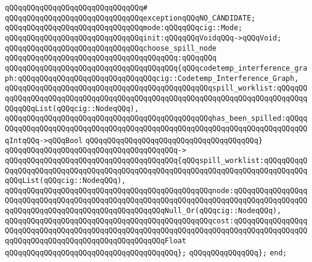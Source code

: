 \verb|qQQqqQQqqQQqqQQqqQQqqQQqqQQqqQQq#|\newline
\verb|qQQqqQQqqQQqqQQqqQQqqQQqqQQqqQQqexceptionqQQqNO_CANDIDATE;|\newline
\newline
\verb|qQQqqQQqqQQqqQQqqQQqqQQqqQQqqQQqmode:qQQqqQQqcig::Mode;|\newline
\newline
\verb|qQQqqQQqqQQqqQQqqQQqqQQqqQQqqQQqinit:qQQqqQQqVoidqQQq->qQQqVoid;|\newline
\newline
\verb|qQQqqQQqqQQqqQQqqQQqqQQqqQQqqQQqchoose_spill_node|\newline
\verb|qQQqqQQqqQQqqQQqqQQqqQQqqQQqqQQqqQQqqQQq:qQQqqQQq|\newline
\verb|qQQqqQQqqQQqqQQqqQQqqQQqqQQqqQQqqQQqqQQq{qQQqcodetemp_interference_graph:qQQqqQQqqQQqqQQqqQQqqQQqqQQqqQQqcig::Codetemp_Interference_Graph,|\newline
\verb|qQQqqQQqqQQqqQQqqQQqqQQqqQQqqQQqqQQqqQQqqQQqqQQqspill_worklist:qQQqqQQqqQQqqQQqqQQqqQQqqQQqqQQqqQQqqQQqqQQqqQQqqQQqqQQqqQQqqQQqqQQqqQQqqQQqqQQqqQQqList(qQQqcig::NodeqQQq),|\newline
\verb|qQQqqQQqqQQqqQQqqQQqqQQqqQQqqQQqqQQqqQQqqQQqqQQqhas_been_spilled:qQQqqQQqqQQqqQQqqQQqqQQqqQQqqQQqqQQqqQQqqQQqqQQqqQQqqQQqqQQqqQQqqQQqqQQqqQQqIntqQQq->qQQqBool|\newline
\verb|qQQqqQQqqQQqqQQqqQQqqQQqqQQqqQQqqQQqqQQq}|\newline
\verb|qQQqqQQqqQQqqQQqqQQqqQQqqQQqqQQqqQQqqQQq->|\newline
\verb|qQQqqQQqqQQqqQQqqQQqqQQqqQQqqQQqqQQqqQQq{qQQqspill_worklist:qQQqqQQqqQQqqQQqqQQqqQQqqQQqqQQqqQQqqQQqqQQqqQQqqQQqqQQqqQQqqQQqqQQqqQQqqQQqqQQqqQQqList(qQQqcig::NodeqQQq),|\newline
\verb|qQQqqQQqqQQqqQQqqQQqqQQqqQQqqQQqqQQqqQQqqQQqqQQqnode:qQQqqQQqqQQqqQQqqQQqqQQqqQQqqQQqqQQqqQQqqQQqqQQqqQQqqQQqqQQqqQQqqQQqqQQqqQQqqQQqqQQqqQQqqQQqqQQqqQQqqQQqqQQqqQQqqQQqqQQqqQQqNull_Or(qQQqcig::NodeqQQq),|\newline
\verb|qQQqqQQqqQQqqQQqqQQqqQQqqQQqqQQqqQQqqQQqqQQqqQQqcost:qQQqqQQqqQQqqQQqqQQqqQQqqQQqqQQqqQQqqQQqqQQqqQQqqQQqqQQqqQQqqQQqqQQqqQQqqQQqqQQqqQQqqQQqqQQqqQQqqQQqqQQqqQQqqQQqqQQqqQQqqQQqFloat|\newline
\verb|qQQqqQQqqQQqqQQqqQQqqQQqqQQqqQQqqQQqqQQq};|\newline
\verb|qQQqqQQqqQQqqQQq};|\newline
\verb|end;|\newline


